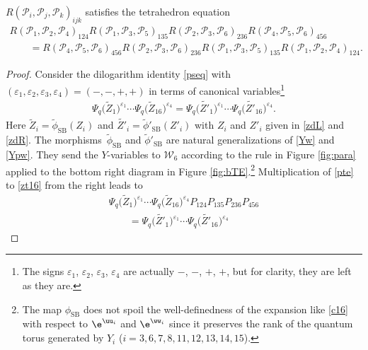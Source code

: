 \begin{Theorem}\label{th:main}
$R(\mathscr{P}_i, \mathscr{P}_j, \mathscr{P}_k)_{ijk} $ satisfies the tetrahedron equation
\begin{gather}
 R(\mathscr{P}_1, \mathscr{P}_2, \mathscr{P}_4)_{124}
R(\mathscr{P}_1, \mathscr{P}_3, \mathscr{P}_5)_{135}
R(\mathscr{P}_2, \mathscr{P}_3, \mathscr{P}_6)_{236}
R(\mathscr{P}_4, \mathscr{P}_5, \mathscr{P}_6)_{456}\nonumber
\\
\qquad= R(\mathscr{P}_4, \mathscr{P}_5, \mathscr{P}_6)_{456}
R(\mathscr{P}_2, \mathscr{P}_3, \mathscr{P}_6)_{236}
R(\mathscr{P}_1, \mathscr{P}_3, \mathscr{P}_5)_{135}
R(\mathscr{P}_1, \mathscr{P}_2, \mathscr{P}_4)_{124}.\label{tela}
\end{gather}
\end{Theorem}
\begin{proof}
 Consider the dilogarithm identity \eqref{pseq} with
 $(\varepsilon_1,\varepsilon_2,\varepsilon_3,\varepsilon_4) =(-, -,
 +, +)$ in terms of canonical variables\footnote{The signs
 $\varepsilon_1$, $\varepsilon_2$, $\varepsilon_3$, $\varepsilon_4$
 are actually $-$, $-$, $+$, $+$, but for clarity, they are left as
 they are.}
\begin{align}\label{zt16}
\Psi_q\bigl(\tilde{Z}_1\bigr)^{\varepsilon_1}\dotsm \Psi_q\bigl({\tilde Z}_{16}\bigr)^{\varepsilon_4}
=
\Psi_q\bigl(\tilde{Z'}_1\bigr)^{\varepsilon_1}\dotsm \Psi_q\bigl(\tilde{Z'}_{16}\bigr)^{\varepsilon_4}.
\end{align}
Here $\tilde{Z}_i = \tilde{\phi}_\mathrm{SB}(Z_i)$ and
$\tilde{Z'}_i =\tilde{\phi}'_\mathrm{SB}(Z'_i)$ with $Z_i$ and $Z'_i$
given in \eqref{zdL} and \eqref{zdR}. The morphisms~$\tilde{\phi}_\mathrm{SB}$ and $\tilde{\phi}'_\mathrm{SB}$ are natural
generalizations of \eqref{Yw} and \eqref{Ypw}. They send the
$Y$-variables to $\mathcal{W}_6$ according to the rule in Figure
\ref{fig:para} applied to the bottom right diagram in Figure
\ref{fig:bTE}.\footnote{The map $\phi_\mathrm{SB}$ does not spoil the
 well-definedness of the expansion like \eqref{c16} with respect to
 $\e^{\uu_i}$ and $\e^{\ww_i}$ since it preserves the rank of the quantum
 torus generated by $Y_i$ ($i=3, 6 , 7 , 8 , 11 , 12 , 13 ,
 14 , 15$).}
%
Multiplication of \eqref{pte} to \eqref{zt16} from the right leads to
\begin{gather}
\Psi_q\bigl(\tilde{Z}_1\bigr)^{\varepsilon_1}\dotsm \Psi_q\bigl({\tilde Z}_{16}\bigr)^{\varepsilon_4}
P_{124}P_{135}P_{236}P_{456}\nonumber\\
\qquad=
\Psi_q\bigl(\tilde{Z'}_1\bigr)^{\varepsilon_1}\dotsm \Psi_q\bigl(\tilde{Z'}_{16}\bigr)^{\varepsilon_4}

\end{gather}
\end{proof}
